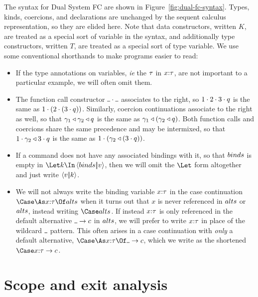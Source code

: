 \documentclass{article}
\begin{document}
The syntax for Dual System FC are shown in Figure~\ref{fig:dual-fc-syntax}.
Types, kinds, coercions, and declarations are unchanged by the sequent calculus
representation, so they are elided here.  Note that data constructors, written
$K$, are treated as a special sort of variable in the syntax, and additionally
type constructors, written $T$, are treated as a special sort of type variable.
We use some conventional shorthands to make programs easier to read:
\begin{itemize}
\item If the type annotations on variables, \emph{ie} the $\tau$ in $x{:}{\tau}$,
  are not important to a particular example, we will often omit them.
\item The function call constructor $\app{\blank}{\blank}$ associates to the
  right, so ${1}\cdot{{2}\cdot{{3}\cdot{q}}}$ is the same as
  ${1}\cdot{({2}\cdot{({3}\cdot{q})})}$.  Similarly, coercion continuations
  associate to the right as well, so that ${\gamma_1}\triangleleft{{\gamma_2}\triangleleft{q}}$ is
  the same as ${\gamma_1}\triangleleft{({\gamma_2}\triangleleft{q})}$.  Both function calls and
  coercions share the same precedence and may be intermixed, so that
  ${1}\cdot{{\gamma_2}\triangleleft{{3}\cdot{q}}}$ is the same as
  ${1}\cdot{({\gamma_2}\triangleleft{({3}\cdot{q})})}$.
\item If a command does not have any associated bindings with it, so that
  $binds$ is empty in $\mcut{\binds}{\tm}{\ko}$, then we will omit the $\Let$
  form altogether and just write $\left\langle{v}\middle|\!\middle|{k}\right\rangle$.
\item We will not always write the binding variable $x{:}{\tau}$ in the case
  continuation $\caseas{\ann x \ty}{\alts}$ when it turns out that $x$ is never
  referenced in $alts$ or $alts$, instead writing $\Case\alts$.  If instead
  $x{:}{\tau}$ is only referenced in the default alternative
  $\alt{\blank}{\com}$ in $alts$, we will prefer to write $x{:}{\tau}$ in place
  of the wildcard $\blank$ pattern.  This often arises in a case continuation
  with \emph{only} a default alternative,
  $\caseas{\ann x \ty}{\alt{\blank}{\com}}$, which we write as the shortened
  $\Case\alt{\ann x \ty}{\com}$.
\end{itemize}

\section{Scope and exit analysis}
\label{sec:scope-analysis}
\end{document}
